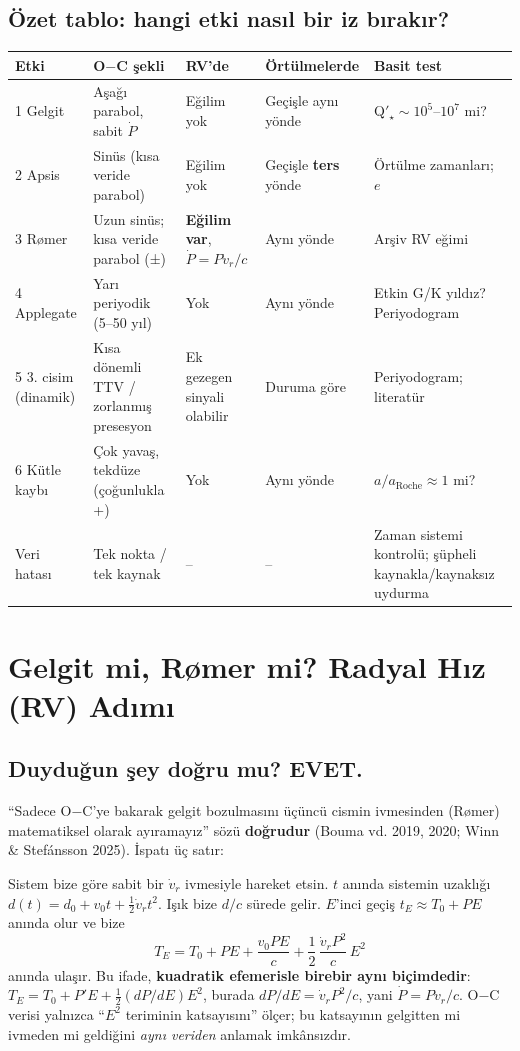 \subsection{Özet tablo: hangi etki nasıl bir iz bırakır?}
\begin{center}
\small
\begin{tabularx}{\textwidth}{l >{\raggedright\arraybackslash}X >{\raggedright\arraybackslash}X >{\raggedright\arraybackslash}X >{\raggedright\arraybackslash}X}
\toprule
Etki & O$-$C şekli & RV'de & Örtülmelerde & Basit test\\
\midrule
1 Gelgit & Aşağı parabol, sabit $\dot P$ & Eğilim yok & Geçişle aynı yönde & Q$'_\star\sim10^5$–$10^7$ mi?\\
2 Apsis & Sinüs (kısa veride parabol) & Eğilim yok & Geçişle \textbf{ters} yönde & Örtülme zamanları; $e$\\
3 Rømer & Uzun sinüs; kısa veride parabol (±) & \textbf{Eğilim var}, $\dot P = P\dot v_r/c$ & Aynı yönde & Arşiv RV eğimi\\
4 Applegate & Yarı periyodik (5–50 yıl) & Yok & Aynı yönde & Etkin G/K yıldız? Periyodogram\\
5 3. cisim (dinamik) & Kısa dönemli TTV / zorlanmış presesyon & Ek gezegen sinyali olabilir & Duruma göre & Periyodogram; literatür\\
6 Kütle kaybı & Çok yavaş, tekdüze (çoğunlukla +) & Yok & Aynı yönde & $a/a_\text{Roche}\approx1$ mi?\\
Veri hatası & Tek nokta / tek kaynak & -- & -- & Zaman sistemi kontrolü; şüpheli kaynakla/kaynaksız uydurma\\
\bottomrule
\end{tabularx}
\end{center}

\section{Gelgit mi, Rømer mi? Radyal Hız (RV) Adımı}
\label{sec:rv}

\subsection{Duyduğun şey doğru mu? EVET.}
“Sadece O$-$C'ye bakarak gelgit bozulmasını üçüncü cismin ivmesinden (Rømer) matematiksel olarak ayıramayız” sözü
\textbf{doğrudur} (Bouma vd. 2019, 2020; Winn \& Stefánsson 2025). İspatı üç satır:

Sistem bize göre sabit bir $\dot v_r$ ivmesiyle hareket etsin. $t$ anında sistemin uzaklığı
$d(t) = d_0 + v_0 t + \tfrac12 \dot v_r t^2$. Işık bize $d/c$ sürede gelir. $E$'inci geçiş $t_E \approx T_0 + PE$
anında olur ve bize
\[
T_E = T_0 + PE + \frac{v_0 P E}{c} + \frac{1}{2}\,\frac{\dot v_r P^2}{c}\,E^2
\]
anında ulaşır. Bu ifade, \textbf{kuadratik efemerisle birebir aynı biçimdedir}: $T_E = T_0 + P'E + \tfrac12 (dP/dE)E^2$,
burada $dP/dE = \dot v_r P^2/c$, yani $\dot P = P\dot v_r/c$. O$-$C verisi yalnızca “$E^2$ teriminin katsayısını”
ölçer; bu katsayının gelgitten mi ivmeden mi geldiğini \emph{aynı veriden} anlamak imkânsızdır.

